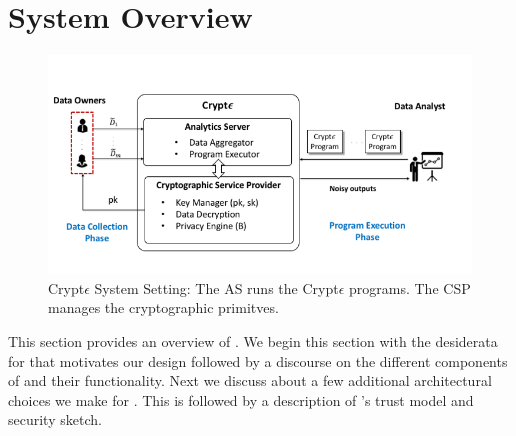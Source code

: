\section{System Overview}

\begin{figure}
\includegraphics[width=\columnwidth]{cryptE_pic.png}\caption{ Crypt$\epsilon$ System Setting: The  \textsf{AS} runs the Crypt$\epsilon$ programs. The \textsf{CSP} manages the cryptographic primitves. } \end{figure}
This section provides an overview of \system. We begin this section with the desiderata for \system that motivates our design followed by a discourse on the different components of \system and their functionality. Next we discuss about a few additional architectural choices we make for \system. This is followed by a description of \system's trust model and security sketch.
